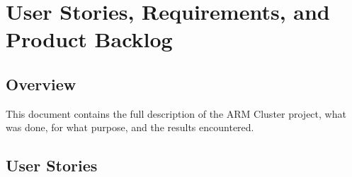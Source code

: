 
\chapter{User Stories,  Requirements, and Product Backlog}
\section{Overview}


This document contains the full description of the ARM Cluster project, what was done, for what purpose, and the results encountered. 





\section{User Stories}


